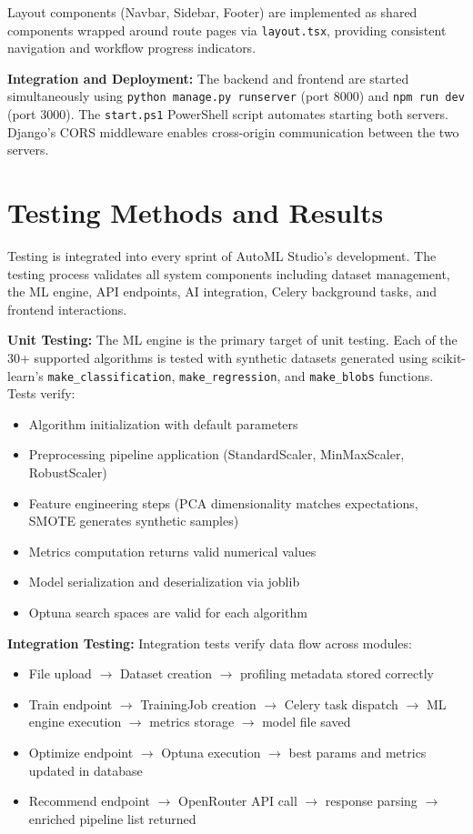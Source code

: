 \documentclass[12pt,a4paper]{report}
\begin{document}
Layout components (Navbar, Sidebar, Footer) are implemented as shared components wrapped around route pages via \texttt{layout.tsx}, providing consistent navigation and workflow progress indicators.

\textbf{Integration and Deployment:}
The backend and frontend are started simultaneously using \texttt{python manage.py runserver} (port 8000) and \texttt{npm run dev} (port 3000). The \texttt{start.ps1} PowerShell script automates starting both servers. Django's CORS middleware enables cross-origin communication between the two servers.

\section{Testing Methods and Results}

Testing is integrated into every sprint of AutoML Studio's development. The testing process validates all system components including dataset management, the ML engine, API endpoints, AI integration, Celery background tasks, and frontend interactions.

\textbf{Unit Testing:}
The ML engine is the primary target of unit testing. Each of the 30+ supported algorithms is tested with synthetic datasets generated using scikit-learn's \texttt{make\_classification}, \texttt{make\_regression}, and \texttt{make\_blobs} functions. Tests verify:
\begin{itemize}
    \item Algorithm initialization with default parameters
    \item Preprocessing pipeline application (StandardScaler, MinMaxScaler, RobustScaler)
    \item Feature engineering steps (PCA dimensionality matches expectations, SMOTE generates synthetic samples)
    \item Metrics computation returns valid numerical values
    \item Model serialization and deserialization via joblib
    \item Optuna search spaces are valid for each algorithm
\end{itemize}

\textbf{Integration Testing:}
Integration tests verify data flow across modules:
\begin{itemize}
    \item File upload $\rightarrow$ Dataset creation $\rightarrow$ profiling metadata stored correctly
    \item Train endpoint $\rightarrow$ TrainingJob creation $\rightarrow$ Celery task dispatch $\rightarrow$ ML engine execution $\rightarrow$ metrics storage $\rightarrow$ model file saved
    \item Optimize endpoint $\rightarrow$ Optuna execution $\rightarrow$ best params and metrics updated in database
    \item Recommend endpoint $\rightarrow$ OpenRouter API call $\rightarrow$ response parsing $\rightarrow$ enriched pipeline list returned
\end{itemize}
\end{document}
